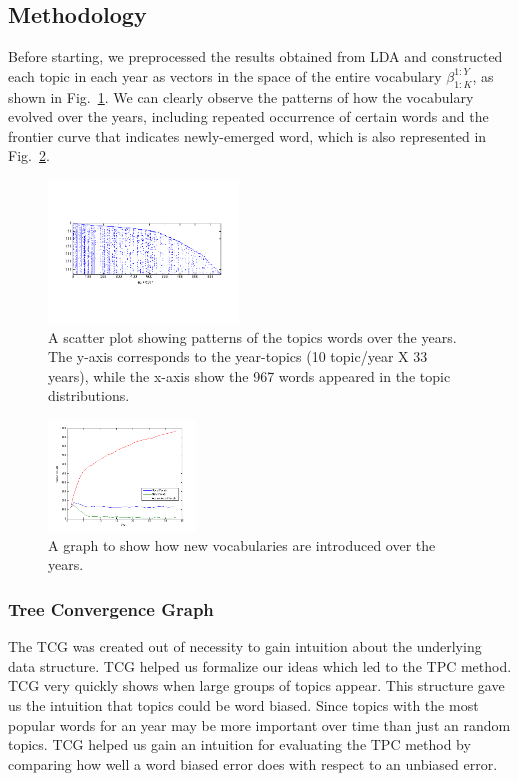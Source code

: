 \documentclass[conference]{IEEEtran}
\begin{document}
\subsection{Methodology}

Before starting, we preprocessed the results obtained from LDA and constructed each topic in each year as vectors in the space of the entire vocabulary $\beta_{1:K}^{1:Y}$, as shown in Fig.~\ref{spy}. We can clearly observe the patterns of how the vocabulary evolved over the years, including repeated occurrence of certain words and the frontier curve that indicates newly-emerged word, which is also represented in Fig.~\ref{vocabs}.
\begin{figure}[h]
    \center    
	\includegraphics[width=0.45\textwidth]{fig/spy.png}
	\caption{A scatter plot showing patterns of the topics words over the years. The y-axis corresponds to the year-topics (10 topic/year X 33 years), while the x-axis show the 967 words appeared in the topic distributions.}
	\label{spy}
\end{figure}

\begin{figure}[h]
    \center    
	\includegraphics[width=0.35\textwidth]{fig/vocabs.png}
	\caption{A graph to show how new vocabularies are introduced over the years.}
	\label{vocabs}
\end{figure}


\subsubsection{Tree Convergence Graph}
The TCG was created out of necessity to gain intuition about the underlying data structure. TCG helped us formalize our ideas which led to the TPC method. TCG very quickly shows when large groups of topics appear. This structure gave us the intuition that topics could be word biased. Since topics with the most popular words for an year may be more important over time than just an random topics. TCG helped us gain an intuition for evaluating the TPC method by comparing how well a word biased error does with respect to an unbiased error.
\end{document}
